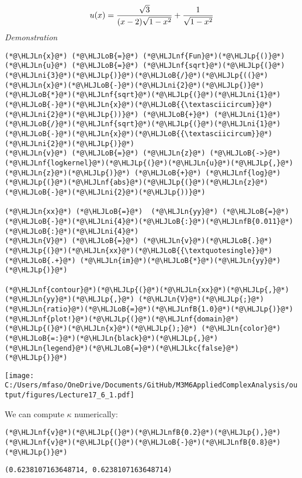 \documentclass[12pt,a4paper]{article}
\newcommand{\HLJLkc}[1]{\textcolor[RGB]{59,151,46}{\textit{#1}}}
\newcommand{\HLJLn}[1]{#1}
\newcommand{\HLJLnf}[1]{\textcolor[RGB]{66,102,213}{#1}}
\newcommand{\HLJLnfB}[1]{\textcolor[RGB]{59,151,46}{#1}}
\newcommand{\HLJLni}[1]{\textcolor[RGB]{59,151,46}{#1}}
\newcommand{\HLJLoB}[1]{\textcolor[RGB]{102,102,102}{\textbf{#1}}}
\newcommand{\HLJLp}[1]{#1}
\begin{document}
\[
u(x) = {\sqrt{3} \over (x - 2) \sqrt{1-x^2}} + {1 \over \sqrt{1-x^2}}
\]
\emph{Demonstration}


\begin{lstlisting}
(*@\HLJLn{x}@*) (*@\HLJLoB{=}@*) (*@\HLJLnf{Fun}@*)(*@\HLJLp{()}@*)
(*@\HLJLn{u}@*) (*@\HLJLoB{=}@*) (*@\HLJLnf{sqrt}@*)(*@\HLJLp{(}@*)(*@\HLJLni{3}@*)(*@\HLJLp{)}@*)(*@\HLJLoB{/}@*)(*@\HLJLp{((}@*)(*@\HLJLn{x}@*)(*@\HLJLoB{-}@*)(*@\HLJLni{2}@*)(*@\HLJLp{)}@*)(*@\HLJLoB{*}@*)(*@\HLJLnf{sqrt}@*)(*@\HLJLp{(}@*)(*@\HLJLni{1}@*)(*@\HLJLoB{-}@*)(*@\HLJLn{x}@*)(*@\HLJLoB{{\textasciicircum}}@*)(*@\HLJLni{2}@*)(*@\HLJLp{))}@*) (*@\HLJLoB{+}@*) (*@\HLJLni{1}@*)(*@\HLJLoB{/}@*)(*@\HLJLnf{sqrt}@*)(*@\HLJLp{(}@*)(*@\HLJLni{1}@*)(*@\HLJLoB{-}@*)(*@\HLJLn{x}@*)(*@\HLJLoB{{\textasciicircum}}@*)(*@\HLJLni{2}@*)(*@\HLJLp{)}@*)
(*@\HLJLn{v}@*) (*@\HLJLoB{=}@*) (*@\HLJLn{z}@*) (*@\HLJLoB{->}@*) (*@\HLJLnf{logkernel}@*)(*@\HLJLp{(}@*)(*@\HLJLn{u}@*)(*@\HLJLp{,}@*) (*@\HLJLn{z}@*)(*@\HLJLp{)}@*) (*@\HLJLoB{+}@*) (*@\HLJLnf{log}@*)(*@\HLJLp{(}@*)(*@\HLJLnf{abs}@*)(*@\HLJLp{(}@*)(*@\HLJLn{z}@*)(*@\HLJLoB{-}@*)(*@\HLJLni{2}@*)(*@\HLJLp{))}@*)

(*@\HLJLn{xx}@*) (*@\HLJLoB{=}@*)  (*@\HLJLn{yy}@*) (*@\HLJLoB{=}@*) (*@\HLJLoB{-}@*)(*@\HLJLni{4}@*)(*@\HLJLoB{:}@*)(*@\HLJLnfB{0.011}@*)(*@\HLJLoB{:}@*)(*@\HLJLni{4}@*)
(*@\HLJLn{V}@*) (*@\HLJLoB{=}@*) (*@\HLJLn{v}@*)(*@\HLJLoB{.}@*)(*@\HLJLp{(}@*)(*@\HLJLn{xx}@*)(*@\HLJLoB{{\textquotesingle}}@*) (*@\HLJLoB{.+}@*) (*@\HLJLn{im}@*)(*@\HLJLoB{*}@*)(*@\HLJLn{yy}@*)(*@\HLJLp{)}@*)

(*@\HLJLnf{contour}@*)(*@\HLJLp{(}@*)(*@\HLJLn{xx}@*)(*@\HLJLp{,}@*) (*@\HLJLn{yy}@*)(*@\HLJLp{,}@*) (*@\HLJLn{V}@*)(*@\HLJLp{;}@*)(*@\HLJLn{ratio}@*)(*@\HLJLoB{=}@*)(*@\HLJLnfB{1.0}@*)(*@\HLJLp{)}@*)
(*@\HLJLnf{plot!}@*)(*@\HLJLp{(}@*)(*@\HLJLnf{domain}@*)(*@\HLJLp{(}@*)(*@\HLJLn{x}@*)(*@\HLJLp{);}@*) (*@\HLJLn{color}@*)(*@\HLJLoB{=:}@*)(*@\HLJLn{black}@*)(*@\HLJLp{,}@*) (*@\HLJLn{legend}@*)(*@\HLJLoB{=}@*)(*@\HLJLkc{false}@*)(*@\HLJLp{)}@*)
\end{lstlisting}

\texttt{[image: C:/Users/mfaso/OneDrive/Documents/GitHub/M3M6AppliedComplexAnalysis/output/figures/Lecture17\_6\_1.pdf]}

We can compute $\kappa$ numerically:


\begin{lstlisting}
(*@\HLJLnf{v}@*)(*@\HLJLp{(}@*)(*@\HLJLnfB{0.2}@*)(*@\HLJLp{),}@*) (*@\HLJLnf{v}@*)(*@\HLJLp{(}@*)(*@\HLJLoB{-}@*)(*@\HLJLnfB{0.8}@*)(*@\HLJLp{)}@*)
\end{lstlisting}

\begin{lstlisting}
(0.6238107163648714, 0.6238107163648714)
\end{lstlisting}
\end{document}
